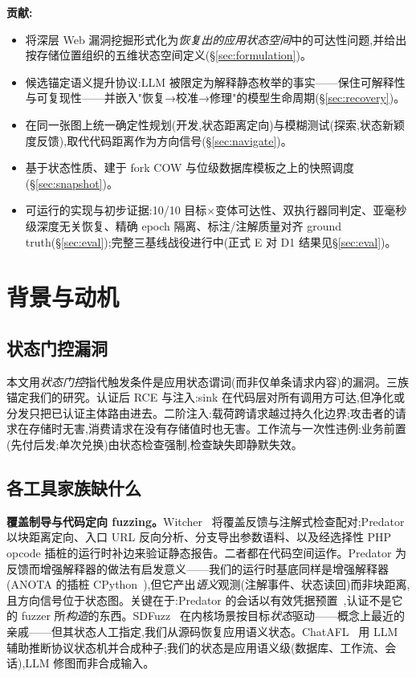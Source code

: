 \documentclass[letterpaper,twocolumn,10pt]{article}
\begin{document}
\textbf{贡献:}
\begin{itemize}
\item 将深层 Web 漏洞挖掘形式化为\emph{恢复出的应用状态空间}中的可达性问题,并给出按存储位置组织的五维状态空间定义(\S\ref{sec:formulation})。
\item 候选锚定语义提升协议:LLM 被限定为解释静态枚举的事实——保住可解释性与可复现性——并嵌入"恢复→校准→修理"的模型生命周期(\S\ref{sec:recovery})。
\item 在同一张图上统一确定性规划(开发,状态距离定向)与模糊测试(探索,状态新颖度反馈),取代代码距离作为方向信号(\S\ref{sec:navigate})。
\item 基于状态性质、建于 fork COW 与位级数据库模板之上的快照调度(\S\ref{sec:snapshot})。
\item 可运行的实现与初步证据:10/10 目标×变体可达性、双执行器同判定、亚毫秒级深度无关恢复、精确 epoch 隔离、标注/注解质量对齐 ground truth(\S\ref{sec:eval});完整三基线战役进行中(正式 E 对 D1 结果见\S\ref{sec:eval})。%
\end{itemize}

\section{背景与动机}
\label{sec:motivation}

\subsection{状态门控漏洞}
本文用\emph{状态门控}指代触发条件是应用状态谓词(而非仅单条请求内容)的漏洞。三族锚定我们的研究。认证后 RCE 与注入:sink 在代码层对所有调用方可达,但净化或分发只把已认证主体路由进去。二阶注入:载荷跨请求越过持久化边界;攻击者的请求在存储时无害,消费请求在没有存储值时也无害。工作流与一次性违例:业务前置(先付后发;单次兑换)由状态检查强制,检查缺失即静默失效。

\subsection{各工具家族缺什么}
\textbf{覆盖制导与代码定向 fuzzing。}Witcher~\cite{witcher} 将覆盖反馈与注解式检查配对;Predator~\cite{predator} 以块距离定向、入口 URL 反向分析、分支导出参数语料、以及经选择性 PHP opcode 插桩的运行时补边来验证静态报告。二者都在代码空间运作。Predator 为反馈而增强解释器的做法有启发意义——我们的运行时基底同样是增强解释器(ANOTA 的插桩 CPython~\cite{anota}),但它产出\emph{语义}观测(注解事件、状态读回)而非块距离,且方向信号位于状态图。关键在于:Predator 的会话以有效凭据预置~\cite{predator},认证不是它的 fuzzer 所\emph{构造}的东西。SDFuzz~\cite{sdfuzz} 在内核场景按目标\emph{状态}驱动——概念上最近的亲戚——但其状态人工指定,我们从源码恢复应用语义状态。ChatAFL~\cite{chatafl} 用 LLM 辅助推断协议状态机并合成种子;我们的状态是应用语义级(数据库、工作流、会话),LLM 修图而非合成输入。
\end{document}

